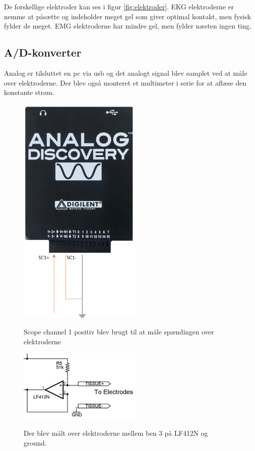 De forskellige elektroder kan ses i figur \ref{fig:elektroder}. EKG elektroderne er nemme at påsætte og indeholder meget gel som giver optimal kontakt, men fysisk fylder de meget. EMG elektroderne har mindre gel, men fylder næsten ingen ting. 






\subsection{A/D-konverter}

Analog er tilsluttet en pc via usb og det analogt signal blev samplet ved at måle over elektroderne. Der blev også monteret et multimeter i serie for at aflæse den konstante strøm.


\begin{figure}[H]
\centering
{\includegraphics[width=6cm]
{Figure/adkonverter}}
\caption{Scope channel 1 positiv blev brugt til at måle spændingen over elektroderne}
\label{fig:adkonverter}
\end{figure}

\begin{figure}[H]
\centering
{\includegraphics[width=6cm]
{Figure/elektroderdia}}
\caption{Der blev målt over elektroderne mellem ben 3 på LF412N og ground.}
\label{fig:elektroderdia}
\end{figure}

